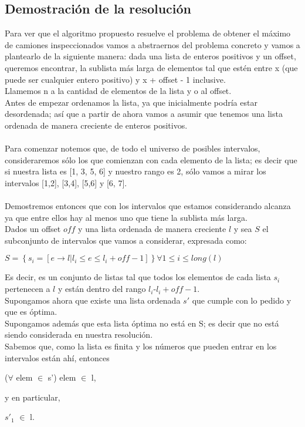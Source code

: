 \subsection{Demostraci\'on de la resoluci\'on}

Para ver que el algoritmo propuesto resuelve el problema de obtener el m\'aximo de camiones inspeccionados vamos a abstraernos del problema concreto y vamos a plantearlo de la siguiente manera: dada una lista de enteros positivos y un offset, queremos encontrar, la sublista m\'as larga de elementos tal que est\'en entre x (que puede ser cualquier entero positivo) y x + offset - 1 inclusive.\\

Llamemos n a la cantidad de elementos de la lista y o al offset.\\
Antes de empezar ordenamos la lista, ya que inicialmente podr\'ia estar desordenada; as\'i que a partir de ahora vamos a asumir que tenemos una lista ordenada de manera creciente de enteros positivos. \\ \\

Para comenzar notemos que, de todo el universo de posibles intervalos, consideraremos s\'olo los que comienzan con cada elemento de la lista; es decir que si nuestra lista es [1, 3, 5, 6] y nuestro rango es 2, s\'olo vamos a mirar los intervalos [1,2], [3,4], [5,6] y [6, 7].\\ \\

Demostremos entonces que con los intervalos que estamos considerando alcanza ya que entre ellos hay al menos uno que tiene la sublista m\'as larga.\\
Dados un offset $off$ y una lista ordenada de manera creciente $l$ y sea $S$ el subconjunto de intervalos que vamos a considerar, expresada como: \\
\begin{center}
$ S = \left\lbrace s_i = \left[ e \rightarrow l | l_i \leq e \leq l_i + off - 1 \right] \right\rbrace \forall 1 \leq i \leq long(l) $ 
\end{center}
Es decir, es un conjunto de listas tal que todos los elementos de cada lista $s_i$ pertenecen a $l$ y est\'an dentro del rango $l_i$-$l_i + off - 1$. \\
Supongamos ahora que existe una lista ordenada $s'$ que cumple con lo pedido y que es \'optima.\\
Supongamos adem\'as que esta lista \'optima no est\'a en S; es decir que no est\'a siendo considerada en nuestra resoluci\'on.\\
Sabemos que, como la lista es finita y los n\'umeros que pueden entrar en los intervalos est\'an ah\'i, entonces \\
\begin{center}
($\forall$ elem $\in$ s') elem $\in$ l, \\
\end{center}
y en particular, \\
\begin{center}
$s'_1$ $\in$ l. \\
\end{center}


